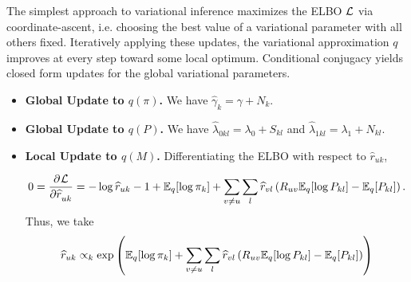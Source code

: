 \documentclass{article}
\begin{document}
\newpage

 The simplest approach to variational inference maximizes the ELBO $\mathcal{L}$ via coordinate-ascent, i.e. choosing the best value of a variational parameter with all others fixed. Iteratively applying these updates, the variational approximation $q$ improves at every step toward some local optimum. Conditional conjugacy yields closed form updates for the global variational parameters. 

\begin{itemize}
\item {\bf Global Update to $q(\pi)$.} We have $\widehat \gamma_{k} = \gamma + N_k$.
\item {\bf Global Update to $q(P)$.} We have $\widehat \lambda_{0kl} = \lambda_0 + S_{kl}$ and $\widehat \lambda_{1kl} = \lambda_1 + N_{kl}$.
\item {\bf Local Update to $q(M)$.} Differentiating the ELBO with respect to $\widehat r_{uk}$,

$$
0 = \frac{\partial^{}\mathcal{L}}{\partial \widehat r_{uk}^{}}= -\log \widehat r_{uk} -1 + \mathbb{E}_q[\log \pi_k]
+ \sum_{v\neq u} \sum_l \widehat r_{vl}\left(R_{uv}\mathbb{E}_q[\log P_{kl}] - \mathbb{E}_q[P_{kl}]\right).
$$
Thus, we take 
$$
\widehat r_{uk} \propto_k \exp\left(\mathbb{E}_q[\log \pi_k]
+ \sum_{v\neq u} \sum_l \widehat r_{vl}\left(R_{uv}\mathbb{E}_q[\log P_{kl}] - \mathbb{E}_q[P_{kl}]\right)\right)
$$


\end{itemize}
\end{document}
